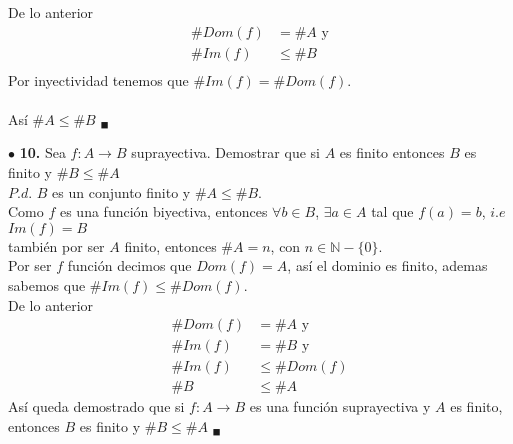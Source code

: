 \documentclass[12pt]{article}
\begin{document}
De lo anterior
\begin{align*}
    \# Dom(f) &= \# A \text{ y}\\
    \# Im(f) &\leq \# B\\
\end{align*}
Por inyectividad tenemos que $\# Im(f) = \# Dom(f)$.\\
\\
Así $\# A \leq \# B$ $_\blacksquare$

\vspace{0.5cm}
%
%
$\bullet$ \textbf{10.} Sea ${\displaystyle f: A \longrightarrow B}$ suprayectiva. Demostrar que si $A$ es finito entonces $B$ es finito y $\# B \leq \#A$\\

$P.d$. $B$ es un conjunto finito y $\# A \leq \#B$.\\

Como $f$ es una función biyectiva, entonces $\forall b \in B$, $\exists a \in A$ tal que $f(a) = b$, $i.e$ $Im(f) = B$\\

también por ser $A$ finito, entonces $\# A = n$, con $n \in \mathbb{N} - \{0\}$.\\

Por ser $f$ función decimos que $Dom(f) = A$, así el dominio es finito, ademas sabemos que $\# Im(f) \leq \# Dom(f)$.\\

De lo anterior
\begin{align*}
    \# Dom(f) &= \# A \text{ y}\\
    \# Im(f) &= \# B \text{ y}\\
    \# Im(f) &\leq \# Dom(f)\\
    \# B &\leq \# A
\end{align*}
Así queda demostrado que si ${\displaystyle f: A \longrightarrow B}$  es una función suprayectiva y $A$ es finito, entonces $B$ es finito y $\#B \leq \# A$ $_\blacksquare$
\end{document}
